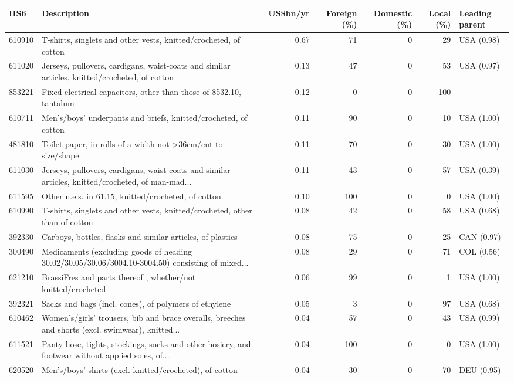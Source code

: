 \begin{tabular}{@{}l p{6.4cm} r r r r l@{}}
\toprule
HS6 & Description & US\$bn/yr & Foreign (\%) & Domestic (\%) & Local (\%) & Leading parent \\
\midrule
610910 & T-shirts, singlets and other vests, knitted/\allowbreak{}crocheted, of cotton & 0.67 & 71 & 0 & 29 & USA (0.98) \\
611020 & Jerseys, pullovers, cardigans, waist-coats and similar articles, knitted/\allowbreak{}crocheted, of cotton & 0.13 & 47 & 0 & 53 & USA (0.97) \\
853221 & Fixed electrical capacitors, other than those of 8532.10, tantalum & 0.12 & 0 & 0 & 100 & -- \\
610711 & Men's/\allowbreak{}boys' underpants and briefs, knitted/\allowbreak{}crocheted, of cotton & 0.11 & 90 & 0 & 10 & USA (1.00) \\
481810 & Toilet paper, in rolls of a width not >36cm/\allowbreak{}cut to size/\allowbreak{}shape & 0.11 & 70 & 0 & 30 & USA (1.00) \\
611030 & Jerseys, pullovers, cardigans, waist-coats and similar articles, knitted/\allowbreak{}crocheted, of man-mad... & 0.11 & 43 & 0 & 57 & USA (0.39) \\
611595 & Other n.e.s. in 61.15, knitted/\allowbreak{}crocheted, of cotton. & 0.10 & 100 & 0 & 0 & USA (1.00) \\
610990 & T-shirts, singlets and other vests, knitted/\allowbreak{}crocheted, other than of cotton & 0.08 & 42 & 0 & 58 & USA (0.68) \\
392330 & Carboys, bottles, flasks and similar articles, of plastics & 0.08 & 75 & 0 & 25 & CAN (0.97) \\
300490 & Medicaments (excluding goods of heading 30.02/\allowbreak{}30.05/\allowbreak{}30.06/\allowbreak{}3004.10-3004.50) consisting of mixed... & 0.08 & 29 & 0 & 71 & COL (0.56) \\
621210 & BrassiFres and parts thereof , whether/\allowbreak{}not knitted/\allowbreak{}crocheted & 0.06 & 99 & 0 & 1 & USA (1.00) \\
392321 & Sacks and bags (incl. cones), of polymers of ethylene & 0.05 & 3 & 0 & 97 & USA (0.68) \\
610462 & Women's/\allowbreak{}girls' trousers, bib and brace overalls, breeches and shorts (excl. swimwear), knitted... & 0.04 & 57 & 0 & 43 & USA (0.99) \\
611521 & Panty hose, tights, stockings, socks and other hosiery, and footwear without applied soles, of... & 0.04 & 100 & 0 & 0 & USA (1.00) \\
620520 & Men's/\allowbreak{}boys' shirts (excl. knitted/\allowbreak{}crocheted), of cotton & 0.04 & 30 & 0 & 70 & DEU (0.95) \\
\bottomrule
\end{tabular}
